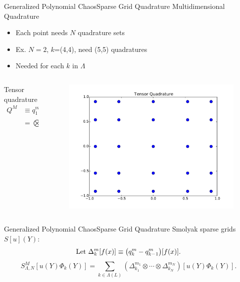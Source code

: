 \documentclass{beamer}
\begin{document}
\begin{frame}{Generalized Polynomial Chaos}{Sparse Grid Quadrature}\vspace{-20pt}
  Multidimensional Quadrature
  \begin{itemize}
    \item Each point needs $N$ quadrature sets
    \item Ex. $N=2$, $k$=(4,4), need (5,5) quadratures
    \item Needed for each $k$ in $\Lambda$
  \end{itemize}
  \begin{columns}
  \begin{column}{0.6\linewidth}
  Tensor quadrature
  \begin{align*}
    Q^{M} &\equiv q^{m_1}_1 \otimes q^{m_2}_2 \otimes \cdots \otimes q^{m_N}_N,\\
                       &= \bigotimes_{n=1}^N q^{m_n}_n.
  \end{align*}
  \end{column}
  \begin{column}{0.4\linewidth}
    \begin{figure}[h!]
      \centering
        \includegraphics[width=\textwidth]{../../graphics/tpquad}
    \end{figure}
  \end{column}
  \end{columns}
\end{frame}

\begin{frame}{Generalized Polynomial Chaos}{Sparse Grid Quadrature}\vspace{-20pt}
Smolyak sparse grids $S[u](Y)$:
\begin{equation*}
  \text{Let }\Delta_k^{m}[f(x)] \equiv \qty(q_k^{m} - q_{k-1}^{m})[f(x)].
\end{equation*}
\vspace{10pt}
\begin{equation*}
  S^{M}_{\Lambda,N}[u(Y)\Phi_k(Y)] = \sum_{k\in\Lambda(L)} \left(\Delta_{k_1}^{m_1} \otimes \cdots \otimes
  \Delta_{k_N}^{m_N}\right)[u(Y)\Phi_k(Y)].
\end{equation*}
\end{frame}
\end{document}
